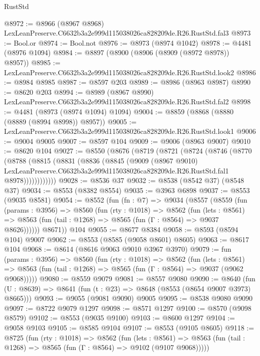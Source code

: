 \begin{lexlean}{RustStd}
\begin{coremodule}
@8972 := @8966 (@8967 @8968) LexLeanPreserve.C6632b3a2e999d115038026ca828209de.R26.RustStd.fal3
@8973 := Bool.or
@8974 := Bool.not
@8976 := @8973 (@8974 @1042)
@8978 := @4481 (@8976 @1094)
@8984 := @8897 (@8900 (@8906 (@8909 (@8972 @8978)) @8957))
@8985 := LexLeanPreserve.C6632b3a2e999d115038026ca828209de.R26.RustStd.look2
@8986 := @8984 @8985
@8987 := @8597 @203
@8989 := @8986 (@8963 @8987)
@8990 := @8620 @203
@8994 := @8989 (@8967 @8990) LexLeanPreserve.C6632b3a2e999d115038026ca828209de.R26.RustStd.fal2
@8998 := @4481 (@8973 (@8974 @1094) @1094)
@9004 := @8859 (@8868 (@8880 (@8889 (@8994 @8998)) @8957))
@9005 := LexLeanPreserve.C6632b3a2e999d115038026ca828209de.R26.RustStd.look1
@9006 := @9004 @9005
@9007 := @8597 @104
@9009 := @9006 (@8963 @9007)
@9010 := @8620 @104
@9027 := @8550
    (@8676
      (@8719
        (@8721
          (@8724
            (@8746
              (@8770
                (@8788
                  (@8815
                    (@8831
                      (@8836
                        (@8845
                          (@9009
                            (@8967 @9010)
                            LexLeanPreserve.C6632b3a2e999d115038026ca828209de.R26.RustStd.fal1
                            @8978))))))))))))
@9028 := @8536 @37
@9032 := @8538 (@8542 @37) (@8548 @37)
@9034 := @8553 (@8382 @8554)
@9035 := @3963 @6898
@9037 := @8553 (@9035 @8581)
@9054 := @8552
    (fun (fn : @7) =>
    @9034
      (@8557
        (@8559
          (fun (params : @3956) =>
          @8560
            (fun (rty : @1018) =>
            @8562
              (fun (lets : @8561) =>
              @8563 (fun (tail : @1268) => @8565 (fun (Γ : @8564) => @9037 @8626))))))
        @8671))
    @104
@9055 := @8677 @8384
@9058 := @8593 (@8594 @104) @9007
@9062 := @8553 (@8585 (@9058 @8601) @8605)
@9063 := @8617 @104
@9068 := @8614 (@8616 @9063 @9010 @3967 @3970)
@9079 := fun (params : @3956) =>
  @8560
    (fun (rty : @1018) =>
    @8562
      (fun (lets : @8561) =>
      @8563 (fun (tail : @1268) => @8565 (fun (Γ : @8564) => @9037 (@9062 @9068)))))
@9080 := @8559 @9079
@9081 := @8557 @9080
@9090 := @8640 (fun (U : @8639) => @8641 (fun (t : @23) => @8648 (@8553 (@8654 @9007 @3973) @8665)))
@9093 := @9055 (@9081 @9090) @9005
@9095 := @8538 @9080 @9090
@9097 := @8722 @9079 @1297
@9098 := @8571 @1297
@9100 := @8570 (@9098 @8579)
@9102 := @8553 (@9035 @9100)
@9103 := @8600 @1297
@9104 := @9058 @9103
@9105 := @8585 @9104
@9107 := @8553 (@9105 @8605)
@9118 := @8725
    (fun (rty : @1018) =>
    @8562
      (fun (lets : @8561) =>
      @8563 (fun (tail : @1268) => @8565 (fun (Γ : @8564) => @9102 (@9107 @9068)))))

\end{coremodule}
\end{lexlean}
